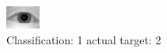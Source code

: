 \begin{figure}[h!]
\begin{center}
\includegraphics[width=0.60\columnwidth]{figures/ID905_class_1_target_2.png}
\end{center}
\caption{ Classification: 1 actual target: 2}
\label{fig:ID905_class_1_target_2}
\end{figure}

